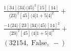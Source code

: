 \documentclass[varwidth, border=5pt]{standalone}
\begin{document}
\begin{my}
$\begin{gathered}
\scriptscriptstyle\frac{1[34]⟨34⟩⟨45⟩^2[15][14]}{⟨23⟩^2[45]⟨4|1+5|4]^2}+\\
\scriptscriptstyle\frac{-1⟨24⟩[23]⟨34⟩⟨45⟩[14]^2}{⟨23⟩^2[45]⟨4|1+5|4]^2}+\\
\scriptscriptstyle(32154,\;\text{False},\;-)\phantom{+}
\end{gathered}$
\end{my}
\end{document}
